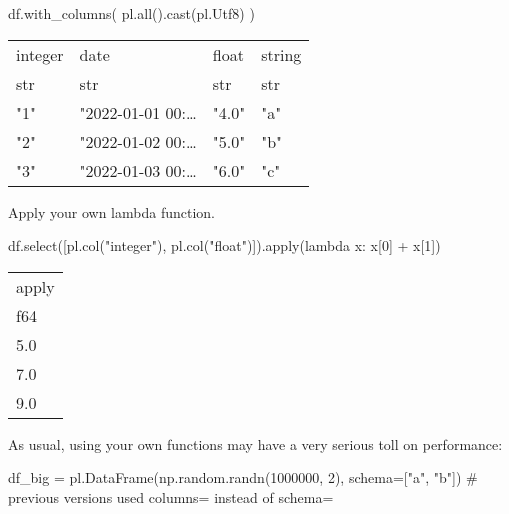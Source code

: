 \documentclass[
  letterpaper,
  DIV=11,
  numbers=noendperiod]{scrartcl}
\newenvironment{Shaded}{\begin{snugshade}}{\end{snugshade}}
\newcommand{\BuiltInTok}[1]{\textcolor[rgb]{0.00,0.23,0.31}{#1}}
\newcommand{\CommentTok}[1]{\textcolor[rgb]{0.37,0.37,0.37}{#1}}
\newcommand{\DecValTok}[1]{\textcolor[rgb]{0.68,0.00,0.00}{#1}}
\newcommand{\KeywordTok}[1]{\textcolor[rgb]{0.00,0.23,0.31}{#1}}
\newcommand{\NormalTok}[1]{\textcolor[rgb]{0.00,0.23,0.31}{#1}}
\newcommand{\OperatorTok}[1]{\textcolor[rgb]{0.37,0.37,0.37}{#1}}
\newcommand{\StringTok}[1]{\textcolor[rgb]{0.13,0.47,0.30}{#1}}
\begin{document}
\begin{Shaded}
\begin{Highlighting}[]
\NormalTok{df.with\_columns(}
\NormalTok{    pl.}\BuiltInTok{all}\NormalTok{().cast(pl.Utf8)}
\NormalTok{)}
\end{Highlighting}
\end{Shaded}

\begin{longtable}[]{@{}llll@{}}
\toprule()
integer & date & float & string \\
str & str & str & str \\
\midrule()
\endhead
"1" & "2022-01-01 00:\ldots{} & "4.0" & "a" \\
"2" & "2022-01-02 00:\ldots{} & "5.0" & "b" \\
"3" & "2022-01-03 00:\ldots{} & "6.0" & "c" \\
\bottomrule()
\end{longtable}

Apply your own lambda function.

\begin{Shaded}
\begin{Highlighting}[]
\NormalTok{df.select([pl.col(}\StringTok{"integer"}\NormalTok{), pl.col(}\StringTok{"float"}\NormalTok{)]).}\BuiltInTok{apply}\NormalTok{(}\KeywordTok{lambda}\NormalTok{ x: x[}\DecValTok{0}\NormalTok{] }\OperatorTok{+}\NormalTok{ x[}\DecValTok{1}\NormalTok{])}
\end{Highlighting}
\end{Shaded}

\begin{longtable}[]{@{}l@{}}
\toprule()
apply \\
f64 \\
\midrule()
\endhead
5.0 \\
7.0 \\
9.0 \\
\bottomrule()
\end{longtable}

As usual, using your own functions may have a very serious toll on
performance:

\begin{Shaded}
\begin{Highlighting}[]
\NormalTok{df\_big }\OperatorTok{=}\NormalTok{ pl.DataFrame(np.random.randn(}\DecValTok{1000000}\NormalTok{, }\DecValTok{2}\NormalTok{), schema}\OperatorTok{=}\NormalTok{[}\StringTok{"a"}\NormalTok{, }\StringTok{"b"}\NormalTok{]) }\CommentTok{\# previous versions used columns= instead of schema=}
\end{Highlighting}
\end{Shaded}
\end{document}

